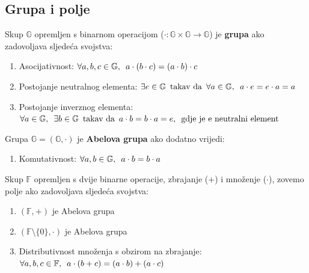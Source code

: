 \documentclass{mathos}
\begin{document}
\subsection{Grupa i polje}
\begin{defin}[Grupa]
    Skup $\mathbb{G}$ opremljen s binarnom operacijom ($\cdot:\mathbb{G}\times\mathbb{G} \to \mathbb{G}$) je \textbf{grupa} ako zadovoljava sljedeća svojstva:
    \begin{enumerate}
        \item Asocijativnost: $\\
            \forall a, b, c \in \mathbb{G}, \enspace a \cdot (b \cdot c) = (a \cdot b) \cdot c
            $
        \item Postojanje neutralnog elementa: $\\
            \exists e \in \mathbb{G} \enspace \text{takav da} \enspace \forall a \in \mathbb{G}, \enspace a \cdot e = e \cdot a = a
        $
        \item Postojanje inverznog elementa: $\\
            \forall a \in \mathbb{G}, \enspace \exists b \in \mathbb{G} \enspace \text{takav da} \enspace a \cdot b = b \cdot a = e, \enspace \text{gdje je e neutralni element}
        $
    \end{enumerate}
    Grupa $\mathbb{G}=(\mathbb{G}, \cdot)$ je \textbf{Abelova grupa} ako dodatno vrijedi:
    \begin{enumerate}
        \item Komutativnost: $\\
            \forall a, b \in \mathbb{G}, \enspace a \cdot b = b \cdot a
            $
    \end{enumerate}
\end{defin}

\begin{defin}[Polje]
    Skup $\mathbb{F}$ opremljen s dvije binarne operacije, zbrajanje ($+$) i množenje ($\cdot$), zovemo polje ako zadovoljava sljedeća svojstva:
    \begin{enumerate}
        \item $(\mathbb{F}, +)$ je Abelova grupa
        \item $(\mathbb{F}\setminus\{0\}, \cdot)$ je Abelova grupa
        \item Distributivnost množenja s obzirom na zbrajanje: $\\
            \forall a, b, c \in \mathbb{F}, \enspace a \cdot (b + c) = (a \cdot b) + (a \cdot c)
        $
    \end{enumerate}
\end{defin}
\end{document}
